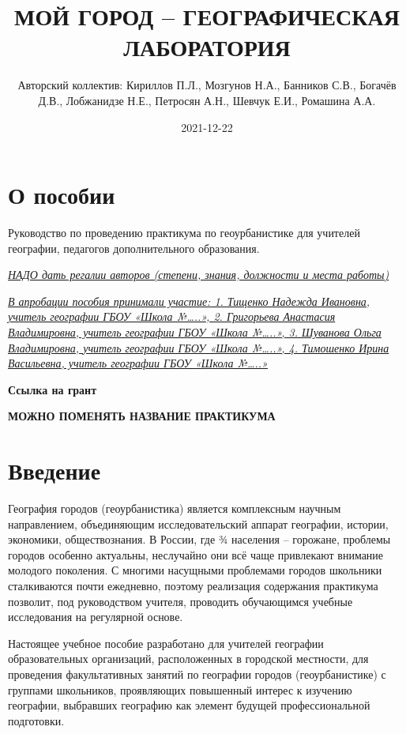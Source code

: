 \documentclass[
  11pt,
  russian,
]{book}
\title{МОЙ ГОРОД -- ГЕОГРАФИЧЕСКАЯ ЛАБОРАТОРИЯ}
\author{Авторский коллектив: Кириллов П.Л., Мозгунов Н.А., Банников С.В., Богачёв Д.В., Лобжанидзе Н.Е., Петросян А.Н., Шевчук Е.И., Ромашина А.А.}
\date{2021-12-22}
\begin{document}
\maketitle

{
\hypersetup{linkcolor=}
\setcounter{tocdepth}{1}
\tableofcontents
}
\hypertarget{ux43e-ux43fux43eux441ux43eux431ux438ux438}{%
\chapter*{О пособии}\label{ux43e-ux43fux43eux441ux43eux431ux438ux438}}

Руководство по проведению практикума по геоурбанистике для учителей географии, педагогов дополнительного образования.

\underline{\emph{НАДО дать регалии авторов (степени, знания, должности и места работы)}}

\underline{\emph{В апробации пособия принимали участие: 1. Тищенко Надежда Ивановна, учитель географии ГБОУ «Школа №\ldots..», 2. Григорьева Анастасия Владимировна, учитель географии ГБОУ «Школа №\ldots..», 3. Шуванова Ольга Владимировна, учитель географии ГБОУ «Школа №\ldots..», 4. Тимошенко Ирина Васильевна, учитель географии ГБОУ «Школа №\ldots..»}}

\textbf{Ссылка на грант}

\textbf{МОЖНО ПОМЕНЯТЬ НАЗВАНИЕ ПРАКТИКУМА}

\hypertarget{ux432ux432ux435ux434ux435ux43dux438ux435}{%
\chapter*{Введение}\label{ux432ux432ux435ux434ux435ux43dux438ux435}}

География городов (геоурбанистика) является комплексным научным направлением, объединяющим исследовательский аппарат географии, истории, экономики, обществознания. В России, где ¾ населения -- горожане, проблемы городов особенно актуальны, неслучайно они всё чаще привлекают внимание молодого поколения. С многими насущными проблемами городов школьники сталкиваются почти ежедневно, поэтому реализация содержания практикума позволит, под руководством учителя, проводить обучающимся учебные исследования на регулярной основе.

Настоящее учебное пособие разработано для учителей географии образовательных организаций, расположенных в городской местности, для проведения факультативных занятий по географии городов (геоурбанистике) с группами школьников, проявляющих повышенный интерес к изучению географии, выбравших географию как элемент будущей профессиональной подготовки.
\end{document}
